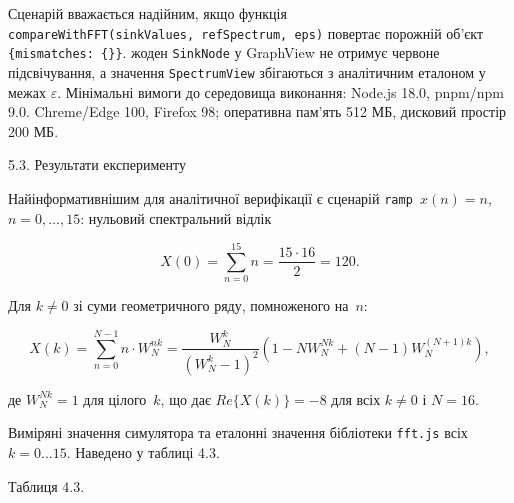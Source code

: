 \documentclass[
]{article}
\begin{document}
Сценарій вважається надійним, якщо функція
\texttt{compareWithFFT}\texttt{(}\texttt{sinkValues}\texttt{,\ }\texttt{refSpectrum}\texttt{,\ }\texttt{eps}\texttt{)}
повертає порожній об'єкт
\texttt{\{}\texttt{mismatches}\texttt{:\ \{\}\}}. жоден
\texttt{SinkNode} у GraphView не отримує червоне підсвічування, а
значення \texttt{SpectrumView} збігаються з аналітичним еталоном у межах
\(\varepsilon\). Мінімальні вимоги до середовища виконання: Node.js
18.0, pnpm/npm 9.0. Chreme/Edge 100, Firefox 98; оперативна пам'ять 512
МБ, дисковий простір 200 МБ.

\protect{}\label{_Toc229681167}{}5.3. Результати
експерименту

Найінформативнішим для аналітичної верифікації є сценарій
\texttt{ramp}\texttt{\ }\(x(n) = n\), \(n = 0,\ldots,15\): нульовий
спектральний відлік

\[X(0) = \sum_{n = 0}^{15}n = \frac{15 \cdot 16}{2} = 120.\]

Для \(k \neq 0\) зі суми геометричного ряду, помноженого на~\(n\):

\[X(k) = \sum_{n = 0}^{N - 1}n \cdot W_{N}^{nk} = \frac{W_{N}^{k}}{(W_{N}^{k} - 1)^{2}}\left( 1 - NW_{N}^{Nk} + (N - 1)W_{N}^{(N + 1)k} \right),\]

де \(W_{N}^{Nk} = 1\) для цілого~\(k\), що дає \(Re\{ X(k)\} = - 8\) для
всіх \(k \neq 0\) і \(N = 16\).

Виміряні значення симулятора та еталонні значення бібліотеки
\texttt{fft.js} всіх \(k = 0\ldots 15\). Наведено у таблиці 4.3.

Таблиця 4.3.
\end{document}

